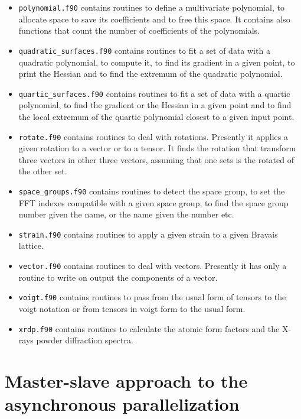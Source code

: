 \documentclass[12pt,a4paper]{article}
\begin{document}
\begin{itemize}
\item
\texttt{polynomial.f90} contains routines to define a multivariate 
polynomial, to allocate space to save its coefficients and to free this
space. It contains also functions that count the number of coefficients 
of the polynomials.

\item
\texttt{quadratic\_surfaces.f90} contains routines to fit a set of data
with a quadratic polynomial, to compute it, to find its gradient 
in a given point, to print the Hessian and to find the extremum of the 
quadratic polynomial. 

\item
\texttt{quartic\_surfaces.f90} contains routines to fit a set of data
with a quartic polynomial, to find the gradient or the Hessian in 
a given point and to find the local extremum of the quartic polynomial
closest to a given input point. 

\item
\texttt{rotate.f90} contains routines to deal with rotations. Presently it
applies a given rotation to a vector or to a tensor.
It finds the rotation that transform three vectors in other three vectors,
assuming that one sets is the rotated of the other set.

\item
\texttt{space\_groups.f90} contains routines to detect the space group,
to set the FFT indexes compatible with a given space group, to find the
space group number given the name, or the name given the number etc.

\item
\texttt{strain.f90} contains routines to apply a given strain to a given
Bravais lattice.

\item
\texttt{vector.f90} contains routines to deal with vectors.
Presently it has only a routine to write on output the components of
a vector.

\item
\texttt{voigt.f90} contains routines to pass from the usual form of tensors
to the voigt notation or from tensors in voigt form to the usual form.

\item
\texttt{xrdp.f90} contains routines to calculate the atomic form factors 
and the X-rays powder diffraction spectra.

\end{itemize}

\newpage
\section{\color{coral}Master-slave approach to the asynchronous parallelization}
\end{document}
